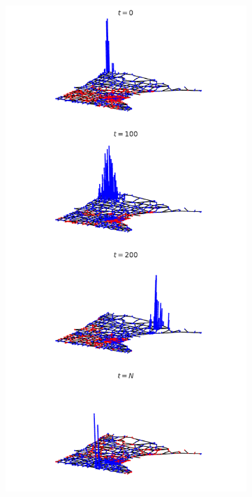 \documentclass{beamer}
\begin{document}
\begin{frame}
\begin{columns}
\begin{column}{0.5\textwidth}
\begin{figure}
\end{figure}
  \end{column}
    \begin{column}{0.5\textwidth}
\begin{figure}
\includegraphics[trim={0 0 0 15cm},clip,width=\linewidth]{../img/basic_operations_0.pdf}
\end{figure}
  \end{column}
  \end{columns}
\end{frame}
\end{document}
